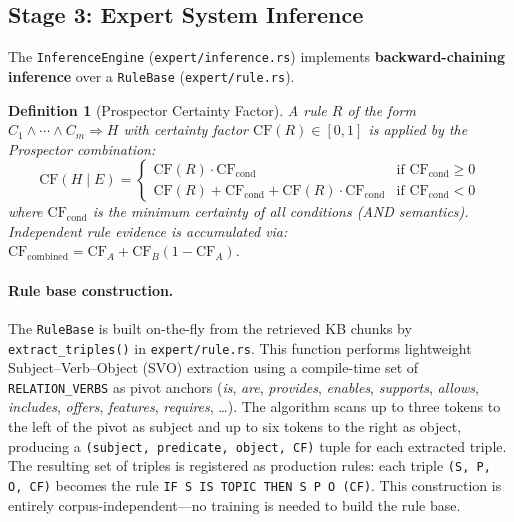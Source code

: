 \documentclass[11pt,a4paper]{article}
\newtheorem{definition}{Definition}[section]
\begin{document}
\subsection{Stage 3: Expert System Inference}
\label{sec:expert}

The \texttt{InferenceEngine} (\texttt{expert/inference.rs}) implements \textbf{backward-chaining
inference} over a \texttt{RuleBase} (\texttt{expert/rule.rs}).

\begin{definition}[Prospector Certainty Factor]
A rule $R$ of the form $C_1 \wedge \cdots \wedge C_m \Rightarrow H$ with certainty factor
$\mathrm{CF}(R) \in [0,1]$ is applied by the Prospector combination:
\begin{equation}
  \mathrm{CF}(H \mid E) =
  \begin{cases}
    \mathrm{CF}(R) \cdot \mathrm{CF}_{\mathrm{cond}} & \text{if } \mathrm{CF}_{\mathrm{cond}} \geq 0 \\
    \mathrm{CF}(R) + \mathrm{CF}_{\mathrm{cond}} + \mathrm{CF}(R)\cdot\mathrm{CF}_{\mathrm{cond}} & \text{if } \mathrm{CF}_{\mathrm{cond}} < 0
  \end{cases}
  \label{eq:cf}
\end{equation}
where $\mathrm{CF}_{\mathrm{cond}}$ is the minimum certainty of all conditions (AND semantics).
Independent rule evidence is accumulated via:
$\mathrm{CF}_{\mathrm{combined}} = \mathrm{CF}_A + \mathrm{CF}_B(1 - \mathrm{CF}_A)$.
\end{definition}

\paragraph{Rule base construction.}
The \texttt{RuleBase} is built on-the-fly from the retrieved KB chunks by \texttt{extract\_triples()}
in \texttt{expert/rule.rs}. This function performs lightweight Subject--Verb--Object (SVO)
extraction using a compile-time set of \texttt{RELATION\_VERBS} as pivot anchors
(\textit{is}, \textit{are}, \textit{provides}, \textit{enables}, \textit{supports}, \textit{allows},
\textit{includes}, \textit{offers}, \textit{features}, \textit{requires}, \ldots). The algorithm
scans up to three tokens to the left of the pivot as subject and up to six tokens to the right as
object, producing a \texttt{(subject, predicate, object, CF)} tuple for each extracted triple.
The resulting set of triples is registered as production rules: each triple
\texttt{(S, P, O, CF)} becomes the rule \texttt{IF S IS TOPIC THEN S P O (CF)}.
This construction is entirely corpus-independent---no training is needed to build the rule base.
\end{document}
